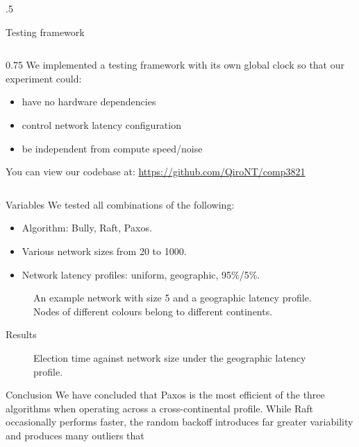\documentclass[final,hyperref={pdfpagelabels=false, colorlinks=true, urlcolor=unsw@blue}]{beamer}
\begin{document}
\begin{frame}{}
\begin{columns}[t]
\begin{column}{.5\linewidth}
\begin{mytealbox}{Testing framework}
\begin{columns}
          \begin{column}{0.75\linewidth}
            We implemented a testing framework with its own global clock so that our experiment could:
            \begin{itemize}
              \item have no hardware dependencies
              \item control network latency configuration
              \item be independent from compute speed/noise
            \end{itemize}
            You can view our codebase at: \href{https://github.com/QiroNT/comp3821}{https://github.com/QiroNT/comp3821}
          \end{column}
        \end{columns}
      \end{mytealbox}
      \begin{myorangebox}{Variables}
        We tested all combinations of the following:
        \begin{itemize}
          \item Algorithm: Bully, Raft, Paxos.
          \item Various network sizes from 20 to 1000.
          \item Network latency profiles: uniform, geographic, 95\%/5\%.
        \end{itemize}
        \begin{figure}
          
          \caption{An example network with size 5 and a geographic latency profile. Nodes of different colours belong to different continents.}
        \end{figure}
      \end{myorangebox}
      \begin{mypinkbox}{Results}
        \begin{figure}
          
          \vspace{-0.7em}
          \caption{Election time against network size under the geographic latency profile.}
          \vspace{-0.7em}
        \end{figure}
      \end{mypinkbox}
      \begin{mybox}{Conclusion}
        We have concluded that Paxos is the most efficient of the three algorithms when operating across a cross-continental profile.
        While Raft occasionally performs faster, the random backoff introduces far greater variability and produces many outliers that

\end{mybox}
\end{column}
\end{columns}
\end{frame}
\end{document}
